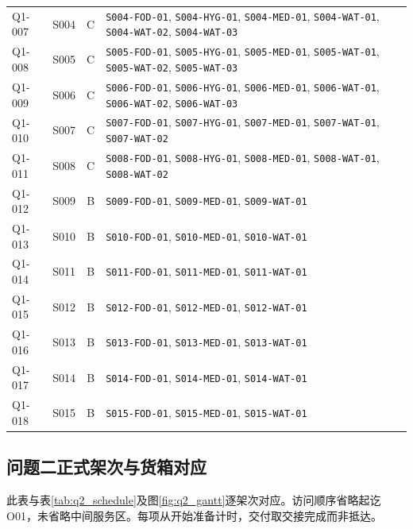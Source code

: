 \documentclass[withoutpreface,colorprint]{format}
\numberwithin{equation}{section}
\numberwithin{figure}{section}
\numberwithin{table}{section}
\begin{document}
\begin{longtable}{@{}llc>{\raggedright\arraybackslash}p{9.3cm}@{}}
Q1-007 & S004 & C & \texttt{S004-FOD-01}\allowbreak, \texttt{S004-HYG-01}\allowbreak, \texttt{S004-MED-01}\allowbreak, \texttt{S004-WAT-01}\allowbreak, \texttt{S004-WAT-02}\allowbreak, \texttt{S004-WAT-03}\allowbreak\\
Q1-008 & S005 & C & \texttt{S005-FOD-01}\allowbreak, \texttt{S005-HYG-01}\allowbreak, \texttt{S005-MED-01}\allowbreak, \texttt{S005-WAT-01}\allowbreak, \texttt{S005-WAT-02}\allowbreak, \texttt{S005-WAT-03}\allowbreak\\
Q1-009 & S006 & C & \texttt{S006-FOD-01}\allowbreak, \texttt{S006-HYG-01}\allowbreak, \texttt{S006-MED-01}\allowbreak, \texttt{S006-WAT-01}\allowbreak, \texttt{S006-WAT-02}\allowbreak, \texttt{S006-WAT-03}\allowbreak\\
Q1-010 & S007 & C & \texttt{S007-FOD-01}\allowbreak, \texttt{S007-HYG-01}\allowbreak, \texttt{S007-MED-01}\allowbreak, \texttt{S007-WAT-01}\allowbreak, \texttt{S007-WAT-02}\allowbreak\\
Q1-011 & S008 & C & \texttt{S008-FOD-01}\allowbreak, \texttt{S008-HYG-01}\allowbreak, \texttt{S008-MED-01}\allowbreak, \texttt{S008-WAT-01}\allowbreak, \texttt{S008-WAT-02}\allowbreak\\
Q1-012 & S009 & B & \texttt{S009-FOD-01}\allowbreak, \texttt{S009-MED-01}\allowbreak, \texttt{S009-WAT-01}\allowbreak\\
Q1-013 & S010 & B & \texttt{S010-FOD-01}\allowbreak, \texttt{S010-MED-01}\allowbreak, \texttt{S010-WAT-01}\allowbreak\\
Q1-014 & S011 & B & \texttt{S011-FOD-01}\allowbreak, \texttt{S011-MED-01}\allowbreak, \texttt{S011-WAT-01}\allowbreak\\
Q1-015 & S012 & B & \texttt{S012-FOD-01}\allowbreak, \texttt{S012-MED-01}\allowbreak, \texttt{S012-WAT-01}\allowbreak\\
Q1-016 & S013 & B & \texttt{S013-FOD-01}\allowbreak, \texttt{S013-MED-01}\allowbreak, \texttt{S013-WAT-01}\allowbreak\\
Q1-017 & S014 & B & \texttt{S014-FOD-01}\allowbreak, \texttt{S014-MED-01}\allowbreak, \texttt{S014-WAT-01}\allowbreak\\
Q1-018 & S015 & B & \texttt{S015-FOD-01}\allowbreak, \texttt{S015-MED-01}\allowbreak, \texttt{S015-WAT-01}\allowbreak\\
\bottomrule
\end{longtable}


\subsection{问题二正式架次与货箱对应}
此表与表\ref{tab:q2_schedule}及图\ref{fig:q2_gantt}逐架次对应。访问顺序省略起讫O01，未省略中间服务区。每项从开始准备计时，交付取交接完成而非抵达。
\end{document}
